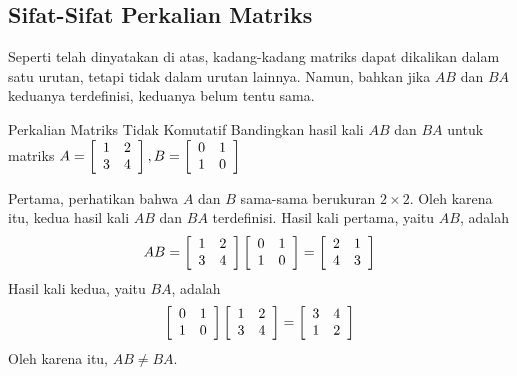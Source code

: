 \subsection{Sifat-Sifat Perkalian Matriks}

Seperti telah dinyatakan di atas, kadang-kadang matriks dapat
dikalikan dalam satu urutan,
tetapi tidak dalam urutan lainnya. Namun, bahkan jika $AB$ dan $BA$ keduanya terdefinisi,
keduanya belum tentu sama. 

\begin{example}{Perkalian Matriks Tidak Komutatif}\label{exa:noncommutativemultiplication}
Bandingkan hasil kali $AB$ dan $BA$ untuk matriks $ A = \left[
\begin{array}{rr}
1 & 2 \\
3 & 4
\end{array}
\right], B= \left[
\begin{array}{rr}
0 & 1 \\
1 & 0
\end{array}
\right] $ 
\end{example}

\begin{solution} 
Pertama, perhatikan bahwa $A$ dan $B$ sama-sama berukuran $2 \times 2$. Oleh karena itu, kedua
hasil kali $AB$ dan $BA$ terdefinisi.
Hasil kali pertama, yaitu $AB$, adalah
\begin{equation*}
AB = \left[
\begin{array}{rr}
1 & 2 \\
3 & 4
\end{array}
\right] \left[
\begin{array}{rr}
0 & 1 \\
1 & 0
\end{array}
\right] = \left[
\begin{array}{rr}
2 & 1 \\
4 & 3
\end{array}
\right] 
\end{equation*}
Hasil kali kedua, yaitu $BA$, adalah
\begin{equation*}
\left[
\begin{array}{rr}
0 & 1 \\
1 & 0
\end{array}
\right] \left[
\begin{array}{rr}
1 & 2 \\
3 & 4
\end{array}
\right] = \left[
\begin{array}{rr}
3 & 4 \\
1 & 2
\end{array}
\right] 
\end{equation*}
Oleh karena itu, $AB \neq BA$. 
\end{solution}

